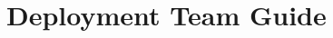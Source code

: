 \documentclass[english]{article}
\begin{document}


















\setcounter{section}{0}
\newpage
\begin{htmlonly}
\end{htmlonly}
\part{Deployment Team Guide}

\end{document}
